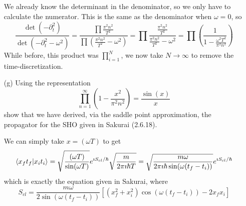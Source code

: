 \documentclass[a4paper,twoside]{article}
\begin{document}
\begin{itemize}
\begin{equation}
        \end{equation}
        We already know the determinant in the denominator, so we only have to calculate the numerator. This is the same as the denominator when $ \omega = 0 $, so
        \begin{equation}
            \frac{\det(-\partial_t^2)}{\det(-\partial_t^2 - \omega^2)} = \frac{\prod \frac{\pi^2 n^2}{T^2}}{\prod \left( \frac{\pi^2 n^2}{T^2} - \omega^2 \right)} = \prod \frac{\frac{\pi^2 n^2}{T^2}}{\frac{\pi^2 n^2}{T^2} - \omega^2} = \prod \left( \frac{1}{1 - \frac{\omega^2 T^2}{\pi^2 n^2}} \right)
        \end{equation}
        While before, this product was $ \prod_{i=1}^{N} $, we now take $ N \to \infty $ to remove the time-discretization.
    \item[(g)] Using the representation
        \begin{equation}
            \prod_{n=1}^{\infty}\left( 1 - \frac{x^2}{\pi^2 n^2} \right) = \frac{\sin(x)}{x} 
        \end{equation}
        show that we have derived, via the saddle point approximation, the propagator for the SHO given in Sakurai (2.6.18).
        \begin{problem}
            We can simply take $ x = (\omega T) $ to get
            \begin{equation}
                \bra{x_f t_f}\ket{x_i t_i} = \sqrt{\frac{(\omega T)}{\sin(\omega T)}} e^{\imath S_{cl} / \hbar} \sqrt{\frac{m}{2 \pi \imath \hbar T}} = \sqrt{\frac{m \omega}{2 \pi \imath \hbar \sin(\omega (t_f - t_i))}} e^{\imath S_{cl} / \hbar}
            \end{equation}
            which is exactly the equation given in Sakurai, where
            \begin{equation}
                S_{cl} = \frac{m \omega}{2 \sin(\omega (t_f - t_i))}\left[ (x_f^2 + x_i^2) \cos(\omega(t_f - t_i)) - 2 x_f x_i\right]
            \end{equation}
        \end{problem}
\end{itemize}
\end{document}
